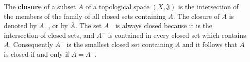 The \textbf{closure} of a subset $A$ of a topological space $(X, \mathfrak{J})$ is the intersection of the members of the family of all closed sets containing $A$. The closure of $A$ is denoted by $A^{-}$, or by $\overline{A}$. The set $A^{-}$ is always closed because it is the intersection of closed sets, and $A^{-}$ is contained in every closed set which contains $A$. Consequently $A^{-}$ is the smallest closed set containing $A$ and it follows that $A$ is closed if and only if $A = A^{-}$.
